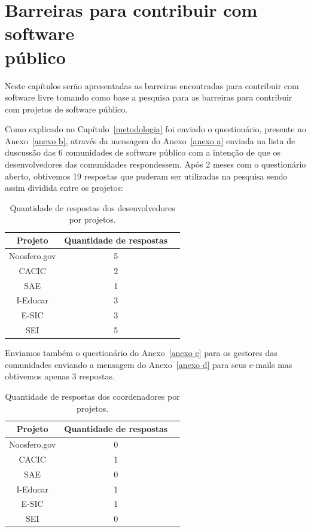\chapter{Barreiras para contribuir com software \\público}
\label{barreiras_publico}

Neste capítulos serão apresentadas as barreiras encontradas para contribuir com
software livre tomando como base a pesquisa para as barreiras para contribuir com
projetos de software público.

Como explicado no Capítulo~\ref{metodologia} foi enviado o questionário, 
presente no Anexo~\ref{anexo b}, através da mensagem do Anexo~\ref{anexo a} 
enviada na lista de duscussão das 6 comunidades de software público com 
a intenção de que os desenvolvedores das comunidades respondessem. Após 2 
meses com o questionário aberto, obtivemos 19 respostas que puderam ser 
utilizadas na pesquisa sendo assim dividida entre os projetos:

\begin{table}[h]
	\centering
	\label{tab01}
	
	\begin{tabular}{ccc}
		\toprule
		\textbf{Projeto} & \textbf{Quantidade de respostas} \\
		\midrule
		Noosfero.gov & 5 \\
		CACIC & 2 \\
		SAE & 1 \\
		I-Educar & 3 \\
		E-SIC & 3 \\
		SEI & 5 \\
		\bottomrule
	\end{tabular}

	\caption{Quantidade de respostas dos desenvolvedores por projetos.}
\end{table}
  

Enviamos também o questionário do Anexo~\ref{anexo e} para os gestores das 
comunidades enviando a mensagem do Anexo~\ref{anexo d} para seus e-mails mas 
obtivemos apenas 3 respostas.

\begin{table}[h]
	\centering
	\label{tab01}
	
	\begin{tabular}{ccc}
		\toprule
		\textbf{Projeto} & \textbf{Quantidade de respostas} \\
		\midrule
		Noosfero.gov & 0 \\
		CACIC & 1 \\
		SAE & 0 \\
		I-Educar & 1 \\
		E-SIC & 1 \\
		SEI & 0 \\
		\bottomrule
	\end{tabular}

	\caption{Quantidade de respostas dos coordenadores por projetos.}
\end{table}



